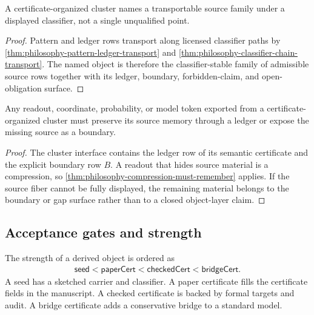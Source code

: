 \begin{corollary}
\label{cor:philosophy-cluster-objects-transportable-source-families}
A certificate-organized cluster names a transportable source family
under a displayed classifier, not a single unqualified point.
\end{corollary}
\begin{proof}
Pattern and ledger rows transport along licensed classifier paths by
\autoref{thm:philosophy-pattern-ledger-transport} and
\autoref{thm:philosophy-classifier-chain-transport}. The named object is
therefore the classifier-stable family of admissible source rows
together with its ledger, boundary, forbidden-claim, and open-obligation
surface.
\end{proof}

\begin{corollary}
\label{cor:philosophy-cluster-compression-preserves-memory}
Any readout, coordinate, probability, or model token exported from a
certificate-organized cluster must preserve its source memory through a
ledger or expose the missing source as a boundary.
\end{corollary}
\begin{proof}
The cluster interface contains the ledger row of its semantic
certificate and the explicit boundary row $B$. A readout that hides
source material is a compression, so
\autoref{thm:philosophy-compression-must-remember} applies. If the
source fiber cannot be fully displayed, the remaining material belongs
to the boundary or gap surface rather than to a closed object-layer
claim.
\end{proof}

\subsection{Acceptance gates and strength}
\label{subsec:philosophy-acceptance-gates-strength}

\begin{definition}
\label{def:philosophy-derivation-strength}
The strength of a derived object is ordered as
$$
\begin{gathered}
\mathsf{seed}<\mathsf{paperCert}<\mathsf{checkedCert}<\mathsf{bridgeCert}.
\end{gathered}
$$
A seed has a sketched carrier and classifier. A paper certificate fills
the certificate fields in the manuscript. A checked certificate is
backed by formal targets and audit. A bridge certificate adds a
conservative bridge to a standard model.
\end{definition}

